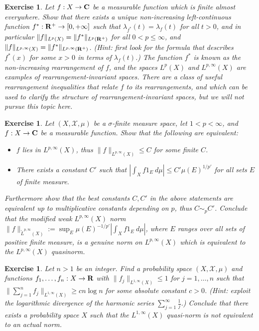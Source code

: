 \documentclass[10pt,reqno]{amsart}
\newtheorem{exercise}[theorem]{Exercise}
\begin{document}
\begin{exercise}
    Let $f: X \rightarrow {\bf C}$ be a measurable function which is finite almost everywhere. Show that there exists a unique non-increasing left-continuous function $f^*: {\bf R}^+ \rightarrow [0,+\infty]$ such that $\lambda_{f^*}(t) = \lambda_f(t)$ for all $t > 0$, and in particular $\|f\|_{L^p(X)} = \|f^*\|_{L^p({\bf R}^+)}$ for all $0 < p \leq \infty$, and $\|f\|_{L^{p,\infty}(X)} = \|f^* \|_{L^{p,\infty}({\bf R}^+)}$. (Hint: first look for the formula that describes $f^*(x)$ for some $x > 0$ in terms of $\lambda_f(t)$.) The function $f^*$ is known as the \emph{non-increasing rearrangement} of $f$, and the spaces $L^p(X)$ and $L^{p,\infty}(X)$ are examples of rearrangement-invariant spaces. There are a class of useful \emph{rearrangement inequalities} that relate $f$ to its rearrangements, and which can be used to clarify the structure of rearrangement-invariant spaces, but we will not pursue this topic here. 
\end{exercise}

\begin{exercise}
    Let $(X,{\mathcal X},\mu)$ be a $\sigma$-finite measure space, let $1 < p < \infty$, and $f: X \rightarrow {\bf C}$ be a measurable function. Show that the following are equivalent:
    \begin{itemize}
        \item $f$ lies in $L^{p,\infty}(X)$, thus $\|f\|_{L^{p,\infty}(X)} \leq C$ for some finite $C$.
        \item There exists a constant $C'$ such that $|\int_X f 1_E\ d\mu| \leq C' \mu(E)^{1/p'}$ for all sets $E$ of finite measure.
    \end{itemize}
    Furthermore show that the best constants $C, C'$ in the above statements are equivalent up to multiplicative constants depending on $p$, thus $C \sim _p C'$. Conclude that the modified weak $L^{p,\infty}(X)$ norm $\| f\|_{\tilde L^{p,\infty}(X)} := \sup_E \mu(E)^{-1/p'} |\int_X f 1_E\ d\mu|$, where $E$ ranges over all sets of positive finite measure, is a genuine norm on $L^{p,\infty}(X)$ which is equivalent to the $L^{p,\infty}(X)$ quasinorm. 
\end{exercise}

\begin{exercise}
    Let $n > 1$ be an integer. Find a probability space $(X,{\mathcal X},\mu)$ and functions $f_1,\ldots,f_n:X \rightarrow {\bf R}$ with $\|f_j\|_{L^{1,\infty}(X)} \leq 1$ for $j=1,\ldots,n$ such that $\|\sum_{j=1}^n f_j\|_{L^{1,\infty}(X)} \geq c n \log n$ for some absolute constant $c>0$. (Hint: exploit the logarithmic divergence of the harmonic series $\sum_{j=1}^\infty \frac{1}{j}$.) Conclude that there exists a probability space $X$ such that the $L^{1,\infty}(X)$ quasi-norm is not equivalent to an actual norm. 
\end{exercise}
\end{document}
